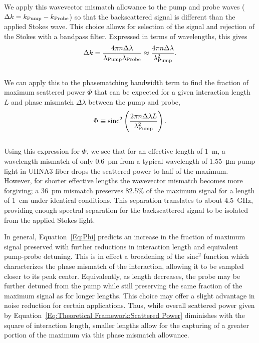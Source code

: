 We apply this wavevector mismatch allowance to the pump and probe waves (\(\Delta k = k_{\rm Pump} - k_{\rm Probe}\)) so that the backscattered signal is different than the applied Stokes wave. This choice allows for selection of the signal and rejection of the Stokes with a bandpass filter. Expressed in terms of wavelengths, this gives
\\
\begin{equation}
  \Delta k = \frac{4\pi n\Delta\lambda}{\lambda_{\rm Pump}\lambda_{\rm Probe}} \approx \frac{4\pi n\Delta\lambda}{\lambda_{\rm Pump}^{2}}.
  \label{Eq:deltak}
\end{equation}
\\
We can apply this to the phasematching bandwidth term to find the fraction of maximum scattered power \(\Phi\) that can be expected for a given interaction length \(L\) and phase mismatch \(\Delta\lambda\) between the pump and probe,
\\
\begin{equation}
  \Phi \equiv \mathrm{sinc}^{2}\left(\frac{2\pi n\Delta\lambda L}{\lambda_{\rm Pump}^{2}}\right).
  \label{Eq:Phi}
\end{equation}
\\
Using this expression for \(\Phi\), we see that for an effective length of \SI{1}{\meter}, a wavelength mismatch of only \SI{0.6}{\pico\meter} from a typical wavelength of \SI{1.55}{\micro\meter} pump light in \ac{UHNA3} fiber drops the scattered power to half of the maximum. However, for shorter effective lengths the wavevector mismatch becomes more forgiving; a \SI{36}{\pico\meter} mismatch preserves 82.5\% of the maximum signal for a length of \SI{1}{\centi\meter} under identical conditions. This separation translates to about \SI{4.5}{\giga\hertz}, providing enough spectral separation for the backscattered signal to be isolated from the applied Stokes light.

In general, Equation~\ref{Eq:Phi} predicts an increase in the fraction of maximum signal preserved with further reductions in interaction length and equivalent pump-probe detuning. This is in effect a broadening of the \(\mathrm{sinc^2}\) function which characterizes the phase mismatch of the interaction, allowing it to be sampled closer to its peak center. Equivalently, as length decreases, the probe may be further detuned from the pump while still preserving the same fraction of the maximum signal as for longer lengths. This choice may offer a slight advantage in noise reduction for certain applications. Thus, while overall scattered power given by Equation~\ref{Eq:Theoretical Framework:Scattered Power} diminishes with the square of interaction length, smaller lengths allow for the capturing of a greater portion of the maximum via this phase mismatch allowance.

